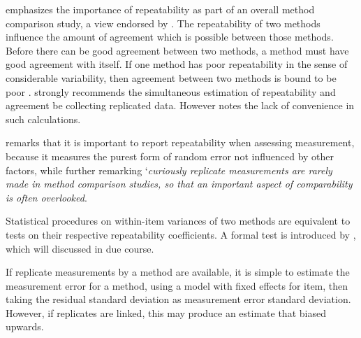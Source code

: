 \documentclass[12pt, a4paper]{report}
\theoremstyle{plain}
\theoremstyle{definition}
\theoremstyle{remark}
\begin{document}


\citet{Barnhart} emphasizes the importance of repeatability as part of an overall method comparison study, a view endorsed by \citet{BXC2008}. The repeatability of two methods influence the amount of agreement which is possible between those methods. Before there can be good agreement between two methods, a method must have good agreement with itself. If one method has poor repeatability in the sense of considerable variability, then agreement between two methods is bound to be poor \citep{ARoy2009}.
\citet{BA99} strongly recommends the simultaneous estimation of repeatability and agreement be collecting replicated data.
However \citet{ARoy2009} notes the lack of convenience in such calculations. 

% 

	

	\citet{Barnhart} remarks that it is important to report repeatability when assessing
	measurement, because it measures the purest form of random error
	not influenced by other factors, while further remarking `\textit{curiously replicate measurements are rarely made in method comparison studies, so that an important aspect of comparability is often overlooked}. 
	
	
		
Statistical procedures on within-item variances of two methods are equivalent to tests on their respective repeatability coefficients. A formal test is introduced by \citet{ARoy2009}, which will discussed in due course.
		
	
	If replicate measurements by a method are available, it is simple to estimate the measurement error for a method, using a model with fixed effects for item, then taking the residual standard deviation as measurement error standard deviation. However, if replicates are linked, this may produce an estimate that biased upwards.
	
	

	
	

		
	
	
	
	
	
\end{document}
